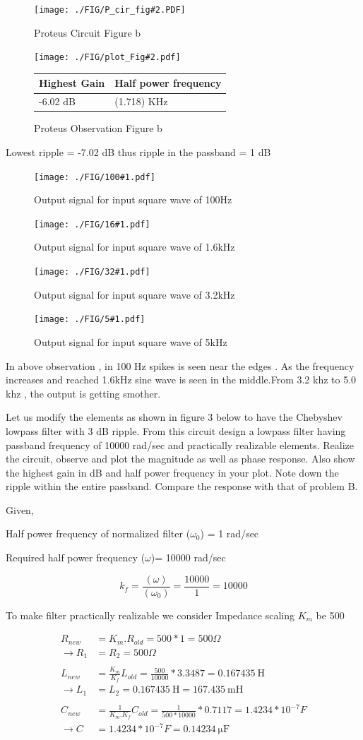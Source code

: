 \documentclass[a4paper,11pt]{article}
\newcommand{\Porcirobs}[4]{
    \begin{figure}[H] %
        \centering
        \texttt{[image: ./FIG/P\_cir\_fig\#2.PDF]}
        \caption{Proteus Circuit Figure #2}
    \end{figure}



    \begin{figure}[H]  %
        \centering
        \texttt{[image: ./FIG/plot\_Fig\#2.pdf]}
        \begin{tabular}[H]{| m{12em}| m{20em}|}
            \hline
            \rowcolor[rgb]{0.569,0.647,0.947} \textbf{Highest Gain } & \textbf{Half power frequency} \\ \hline
            #3 dB         & (#4) KHz     \\  \hline
        \end{tabular}
        \caption{Proteus Observation Figure #2}
    \end{figure}
}
\newcommand{\obsh}[1]{
 \begin{figure}[H]%
    \centering
    \texttt{[image: ./FIG/100\#1.pdf]}
    \caption{Output signal for input square wave of 100Hz}
\end{figure}
}
\newcommand{\obss}[1]{
\begin{figure}[H]%
    \centering
    \texttt{[image: ./FIG/16\#1.pdf]}
    \caption{Output signal for input square wave of 1.6kHz}
\end{figure}
}
\newcommand{\obst}[1]{
\begin{figure}[H]%
    \centering
    \texttt{[image: ./FIG/32\#1.pdf]}
    \caption{Output signal for input square wave of 3.2kHz}
\end{figure}
}
\newcommand{\obsf}[1]{
\begin{figure}[H]%
    \centering
    \texttt{[image: ./FIG/5\#1.pdf]}
    \caption{Output signal for input square wave of 5kHz}
\end{figure}
}
\begin{document}

\Porcirobs{0.85}{b}{-6.02}{1.718}%


Lowest ripple = -7.02 dB thus ripple in the passband = 1 dB

\obsh{b}
\obss{b}
\obst{b}
\obsf{b}

In above observation , in 100 Hz spikes is seen near the edges . As the frequency increases and reached 1.6kHz sine wave is seen in the middle.From 3.2 khz to 5.0 khz , the output is  getting smother.

\begin{Q}
    {
        Let us modify the elements as shown in figure 3 below to have the Chebyshev lowpass filter with
        3 dB ripple. From this circuit design a lowpass filter having passband frequency of 10000 rad/sec
        and practically realizable elements. Realize the circuit, observe and plot the magnitude as well as
        phase response. Also show the highest gain in dB and half power frequency in your plot. Note down the ripple within the entire passband. Compare the response with that of problem B.
    }
\end{Q}



Given,

Half power frequency of normalized filter ($\omega_0$) = 1 rad/sec

Required half power frequency ($\omega$)= 10000 rad/sec


\begin{equation*}
    k_f= \frac{(\omega)}{(\omega_0)} = \frac{10000}{1} = 10000
\end{equation*}

To make filter practically realizable we consider Impedance scaling $K_m$ be 500

\begin{align*}
    R_{new}         & =K_m.R_{old}=500 *1= 500 \Omega                                          \\
    \rightarrow R_1 & =R_2=500 \Omega                                                          \\\\
    L_{new}         & =\frac{K_m}{K_f}L_{old}=\frac{500}{10000}*3.3487=\SI {0.167435} {\henry} \\
    \rightarrow L_1 & =L_2=\SI {0.167435} {\henry}=\SI {167.435} {\milli\henry}                \\\\
    C_{new}         & =\frac{1}{K_m.K_f}C_{old}=\frac{1}{500*10000}*0.7117=1.4234*10^{-7} F    \\
    \rightarrow C   & =1.4234*10^{-7} F=\SI{0.14234}{\micro \farad}                            \\
\end{align*}
\end{document}
